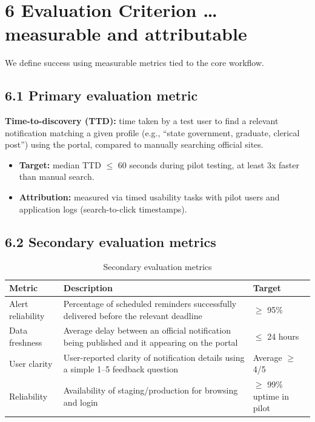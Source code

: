 \documentclass[11pt,a4paper]{article}
\begin{document}
\section*{6 Evaluation Criterion \dots measurable and attributable}
We define success using measurable metrics tied to the core workflow.

\subsection*{6.1 Primary evaluation metric}
\textbf{Time-to-discovery (TTD):} time taken by a test user to find a relevant
notification matching a given profile (e.g., ``state government, graduate,
clerical post'') using the portal, compared to manually searching official
sites.
\begin{itemize}[leftmargin=1.5em]
  \item \textbf{Target:} median TTD $\leq$ 60 seconds during pilot testing,
  at least 3x faster than manual search.
  \item \textbf{Attribution:} measured via timed usability tasks with pilot
  users and application logs (search-to-click timestamps).
\end{itemize}

\subsection*{6.2 Secondary evaluation metrics}
\begin{table}[h]
\centering
\begin{tabular}{|p{3.2cm}|p{7cm}|p{3.5cm}|}
\hline
\textbf{Metric} & \textbf{Description} & \textbf{Target} \\
\hline
Alert reliability & Percentage of scheduled reminders successfully delivered before the relevant deadline & $\geq$ 95\% \\
\hline
Data freshness & Average delay between an official notification being published and it appearing on the portal & $\leq$ 24 hours \\
\hline
User clarity & User-reported clarity of notification details using a simple 1--5 feedback question & Average $\geq$ 4/5 \\
\hline
Reliability & Availability of staging/production for browsing and login & $\geq$ 99\% uptime in pilot \\
\hline
\end{tabular}
\caption{Secondary evaluation metrics}
\end{table}
\end{document}
